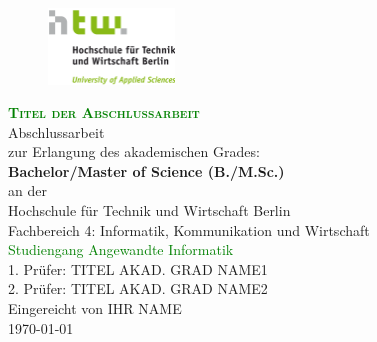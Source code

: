 \documentclass[12pt, oneside]{scrbook}
\begin{document}
	
	\begin{titlepage}
		\begin{figure}[t]
			\centering
			\includegraphics[width=0.3\textwidth]{htw_logo}
		\end{figure}
		\begin{center}
			\vspace*{\fill}
			{\LARGE \scshape \textcolor{green} {\textbf {Titel der Abschlussarbeit}}}\\[2cm]
			
			{\Large Abschlussarbeit}\\[0.3cm]
			{\Large zur Erlangung des akademischen Grades:}\\[0.3cm]
			{\Large \textbf{Bachelor/Master of Science (B./M.Sc.)}}\\[0.7cm]
			
			{\normalsize an der}\\[0.7cm]
			
			{\Large Hochschule für Technik und Wirtschaft Berlin}\\[0.3cm]	
			{\Large Fachbereich 4: Informatik, Kommunikation und Wirtschaft}\\[0.3cm]
			{\Large \textcolor{green} {Studiengang Angewandte Informatik}}\\[2cm]
			
			{\large 1. Prüfer: TITEL AKAD. GRAD NAME1}\\[0.3cm]
			{\large 2. Prüfer: TITEL AKAD. GRAD NAME2}\\[2cm]
			{\large Eingereicht von IHR NAME}\\[0.5cm]
			{\normalsize \today}
			\vfill
		\end{center}
	\end{titlepage}

	\pagestyle{scrplain}
	\frontmatter
	
	
	\tableofcontents
	
	\mainmatter
%	
%       
	
	\clearpage
	
	\begingroup
	\let\cleardoublepage\relax
	
	\listoffigures
	
\end{document}
